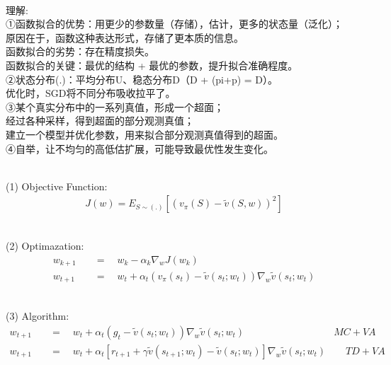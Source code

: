 \documentclass{article}
\begin{document}
~ \\[3pt]
\begin{CJK}{UTF8}{gbsn}
    理解: \\[3pt]
    ①函数拟合的优势：用更少的参数量（存储），估计，更多的状态量（泛化）； \\[3pt]
    原因在于，函数这种表达形式，存储了更本质的信息。 \\[3pt]
    函数拟合的劣势：存在精度损失。 \\[3pt]
    函数拟合的关键：最优的结构 + 最优的参数，提升拟合准确程度。 \\[3pt]
    ②状态分布(.)：平均分布U、稳态分布D（D + (pi+p) = D）。 \\[3pt]
    优化时，SGD将不同分布吸收拉平了。 \\[3pt]
    ③某个真实分布中的一系列真值，形成一个超面； \\[3pt]
    经过各种采样，得到超面的部分观测真值； \\[3pt]
    建立一个模型并优化参数，用来拟合部分观测真值得到的超面。 \\[3pt]
    ④自举，让不均匀的高低估扩展，可能导致最优性发生变化。 \\[3pt]
\end{CJK}


~ \\[3pt]
(1) Objective Function: 
\begin{align*}
    J(w) = E_{S \sim (.)} 
           [ (v_{\pi}(S) - \tilde{v}(S, w) )^2 ] 
\end{align*}

~ \\[3pt]
(2) Optimazation: 
\begin{align*}
    w_{k+1} & 
            \quad = \quad w_{k} - \alpha_{k} 
            \nabla_{w} J(w_{k}) \\[3pt]
    w_{t+1} & 
            \quad = \quad w_{t} + \alpha_{t} 
            (v_{\pi}(s_{t}) - \tilde{v}(s_{t}; w_{t})) 
            \nabla_{w} \tilde{v}(s_{t}; w_{t}) 
\end{align*}

~ \\[3pt]
(3) Algorithm: 
\begin{align*}
    w_{t+1} & 
            \quad = \quad w_{t} + \alpha_{t} 
            (g_{t} - \tilde{v}(s_{t}; w_{t})) 
            \nabla_{w} \tilde{v}(s_{t}; w_{t}) 
            \qquad \qquad \qquad \qquad \quad MC+VA \\[3pt]
    w_{t+1} & 
            \quad = \quad w_{t} + \alpha_{t} 
            [r_{t+1} + \gamma \tilde{v}(s_{t+1}; w_{t}) 
            - \tilde{v}(s_{t}; w_{t})] 
            \nabla_{w} \tilde{v}(s_{t}; w_{t}) 
            \qquad TD+VA 
\end{align*}
\end{document}
